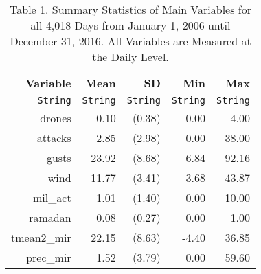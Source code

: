 \begin{table}[ht]
\centering
\caption{Table 1. Summary Statistics of Main Variables for all 4,018 Days from January 1, 2006 until December 31, 2016. All Variables are Measured at the Daily Level.}
\label{tab:summary_statistics}
\begin{tabular}{rrrrr}
  \hline
  \textbf{Variable} & \textbf{Mean} & \textbf{SD} & \textbf{Min} & \textbf{Max} \\
  \texttt{String} & \texttt{String} & \texttt{String} & \texttt{String} & \texttt{String} \\\hline
  drones & 0.10 & (0.38) & 0.00 & 4.00 \\
  attacks & 2.85 & (2.98) & 0.00 & 38.00 \\
  gusts & 23.92 & (8.68) & 6.84 & 92.16 \\
  wind & 11.77 & (3.41) & 3.68 & 43.87 \\
  mil\_act & 1.01 & (1.40) & 0.00 & 10.00 \\
  ramadan & 0.08 & (0.27) & 0.00 & 1.00 \\
  tmean2\_mir & 22.15 & (8.63) & -4.40 & 36.85 \\
  prec\_mir & 1.52 & (3.79) & 0.00 & 59.60 \\\hline
\end{tabular}
\end{table}
